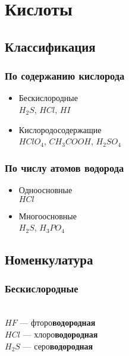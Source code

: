 \newpage
\section{Кислоты}
\subsection{Классификация}
\subsubsection{По содержанию кислорода}
\begin{itemize}
    \item Бескислородные\\
        $H_2S$, $HCl$, $HI$

    \item Кислородосодержащие\\
        $HClO_4$, $CH_3COOH$, $H_2SO_4$
\end{itemize}


\subsubsection{По числу атомов водорода}
\begin{itemize}
    \item Одноосновные\\
        $HCl$

    \item Многоосновные\\
        $H_2S$, $H_3PO_4$

\end{itemize}



\subsection{Номенкулатура}
\subsubsection{Бескислородные}
\\
$HF$   --- фторо\textbf{водородная}\\
$HCl$  --- хлоро\textbf{водородная}\\
$H_2S$ --- серо\textbf{водородная}


